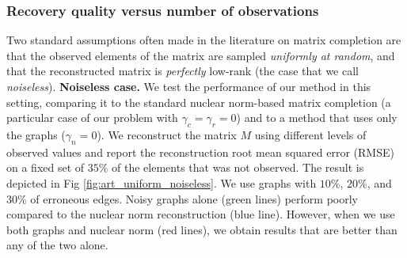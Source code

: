 \documentclass{article}
\begin{document}
\subsubsection{Recovery quality versus number of observations}
\vspace{-0.25cm}
Two standard assumptions often made in the literature on matrix completion are that the observed elements of the matrix are sampled \textit{uniformly at random}, and that the reconstructed matrix is \textit{perfectly} low-rank (the case that we call \textit{noiseless}).
{\bf Noiseless case. } We test the performance of our method in this setting, comparing it to the standard nuclear norm-based matrix completion (a particular case of our problem with $\gamma_c = \gamma_r = 0$) and to a method that uses only the graphs ($\gamma_n = 0$). We reconstruct the matrix $M$ using different levels of observed values and report the reconstruction root mean squared error (RMSE) on a fixed set of $35\%$ of the elements that was not observed. The result is depicted in Fig \ref{fig:art_uniform_noiseless}. 
We use graphs with $10\%$, $20\%$, and $30\%$ of erroneous edges. 
Noisy graphs alone (green lines) perform poorly compared to the nuclear norm reconstruction (blue line). However, when we use both graphs and nuclear norm (red lines), we obtain results that are better than any of the two alone.\\
%
\end{document}
